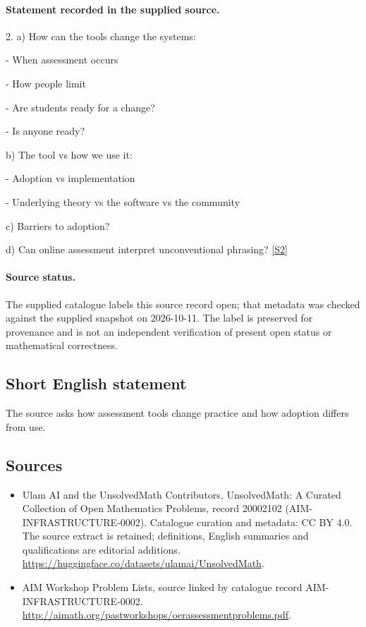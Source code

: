 \documentclass[11pt]{article}
\begin{document}
\paragraph{Statement recorded in the supplied source.}
2. a) How can the tools change the systems:

- When assessment occurs

- How people limit

- Are students ready for a change?

- Is anyone ready?

b) The tool vs how we use it:

- Adoption vs implementation

- Underlying theory vs the software vs the community

c) Barriers to adoption?

d) Can online assessment interpret unconventional phrasing? \href{http://aimath.org/pastworkshops/oerassessmentproblems.pdf}{[S2]}
\paragraph{Source status.}
The supplied catalogue labels this source record open; that metadata was checked against the supplied snapshot on 2026-10-11. The label is preserved for provenance and is not an independent verification of present open status or mathematical correctness.
\subsection{Short English statement}
The source asks how assessment tools change practice and how adoption differs from use.
\subsection{Sources}
\begin{itemize}
\item[S1] Ulam AI and the UnsolvedMath Contributors, UnsolvedMath: A Curated Collection of Open Mathematics Problems, record 20002102 (AIM-INFRASTRUCTURE-0002). Catalogue curation and metadata: CC BY 4.0. The source extract is retained; definitions, English summaries and qualifications are editorial additions.
\url{https://huggingface.co/datasets/ulamai/UnsolvedMath}.
\item[S2] AIM Workshop Problem Lists, source linked by catalogue record AIM-INFRASTRUCTURE-0002.
\url{http://aimath.org/pastworkshops/oerassessmentproblems.pdf}.
\end{itemize}
\end{document}
